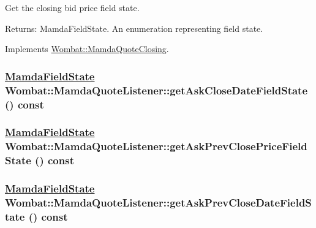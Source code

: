Get the closing bid price field state. 

\begin{Desc}
\item[Returns:]Mamda\-Field\-State. An enumeration representing field state. \end{Desc}


Implements \hyperlink{classWombat_1_1MamdaQuoteClosing_d6c65af52adcf386c114c5b757338072}{Wombat::Mamda\-Quote\-Closing}.\hypertarget{classWombat_1_1MamdaQuoteListener_b9c4ee5e4eda57e1d1c127adc37e544e}{
\subsubsection[getAskCloseDateFieldState]{\setlength{\rightskip}{0pt plus 5cm}\hyperlink{namespaceWombat_93aac974f2ab713554fd12a1fa3b7d2a}{Mamda\-Field\-State} Wombat::Mamda\-Quote\-Listener::get\-Ask\-Close\-Date\-Field\-State () const}}
\label{classWombat_1_1MamdaQuoteListener_b9c4ee5e4eda57e1d1c127adc37e544e}


\hypertarget{classWombat_1_1MamdaQuoteListener_c49f1d6608af00cc869839845491cd23}{
\subsubsection[getAskPrevClosePriceFieldState]{\setlength{\rightskip}{0pt plus 5cm}\hyperlink{namespaceWombat_93aac974f2ab713554fd12a1fa3b7d2a}{Mamda\-Field\-State} Wombat::Mamda\-Quote\-Listener::get\-Ask\-Prev\-Close\-Price\-Field\-State () const}}
\label{classWombat_1_1MamdaQuoteListener_c49f1d6608af00cc869839845491cd23}


\hypertarget{classWombat_1_1MamdaQuoteListener_2c70b33f8a62de075ddc02e953ee199b}{
\subsubsection[getAskPrevCloseDateFieldState]{\setlength{\rightskip}{0pt plus 5cm}\hyperlink{namespaceWombat_93aac974f2ab713554fd12a1fa3b7d2a}{Mamda\-Field\-State} Wombat::Mamda\-Quote\-Listener::get\-Ask\-Prev\-Close\-Date\-Field\-State () const}}
\label{classWombat_1_1MamdaQuoteListener_2c70b33f8a62de075ddc02e953ee199b}



